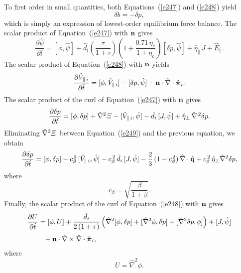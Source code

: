 \documentclass[notitlepage,12pt]{article}
\newcommand{\bpi}{\mbox{\boldmath$\pi$}}
\begin{document}
 To first order in small quantities, both Equations~(\ref{e247}) and (\ref{e248}) yield
 \begin{equation}
 \delta b =- \delta p,
 \end{equation}
 which is simply an expression of lowest-order equilibrium force balance. The scalar product of Equation~(\ref{e247}) with ${\bf n}$ gives
 \begin{equation}\label{e252}
 \frac{\partial\hat{\psi}}{\partial\hat{t}}= [\phi,\hat{\psi}] +\hat{d}_i\!\left(\frac{\tau}{1+\tau}\right)\left(1+\frac{0.71\,\eta_e}{1+\eta_e}\right)
 [\delta p,\hat{\psi}] + \hat{\eta}_\parallel\,J + \hat{E}_\parallel.
 \end{equation}
  The scalar product of Equation~(\ref{e248}) with ${\bf n}$ yields
 \begin{equation}\label{e254}
 \frac{\partial\hat{V}_{\parallel\,i}}{\partial\hat{t}}= [\phi,\hat{V}_{\parallel\,i}]-[\delta p,\hat{\psi}] -{\bf n}\cdot\hat{\nabla}\cdot\hat{\bpi}_i.
 \end{equation}
 The scalar product of the curl of Equation~(\ref{e247}) with ${\bf n}$ gives
 \begin{equation}
 \frac{\partial\delta p}{\partial\hat{t}}= [\phi,\delta p]+\hat{\nabla}^2{\mit\Xi}-[\hat{V}_{\parallel\,i},\hat{\psi}]
 -\hat{d}_i\,[J,\hat{\psi}] +\hat{\eta}_\perp\,\hat{\nabla}^{\,2}\delta p.
 \end{equation}
 Eliminating $\hat{\nabla}^2{\mit\Xi}$ between Equation~(\ref{e249}) and the previous equation, we obtain
 \begin{align}\label{e256}
 \frac{\partial\delta p}{\partial\hat{t}}= [\phi,\delta p]-c_\beta^{\,2}\,[\hat{V}_{\parallel\,i},\hat{\psi}]-c_\beta^{\,2}\,\hat{d}_i\,[J,\hat{\psi}]
 -\frac{2}{3}\,(1-c_\beta^{\,2})\,\hat{\nabla}\cdot\hat{\bf q} +c_\beta^{\,2}\,\hat{\eta}_\perp \hat{\nabla}^2\delta p,
 \end{align}
 where
 \begin{equation}\label{e257}
 c_\beta = \sqrt{\frac{\beta}{1+\beta}}.
 \end{equation}
 Finally, the scalar product of the curl of Equation~(\ref{e248}) with ${\bf n}$ gives 
 \begin{align}\label{e258}
 \frac{\partial U}{\partial\hat{t}}& = [\phi,U] + \frac{\hat{d}_i}{2\,(1+\tau)}\left(
 \hat{\nabla}^2[\phi,\delta p] + [\hat{\nabla}^2\phi,\delta p] + [\hat{\nabla}^2 \delta p,\phi]\right)
 + [J,\hat{\psi}] \nonumber\\[0.5ex]&\phantom{=} + {\bf n}\cdot\hat{\nabla}\times \hat{\nabla}\cdot\hat{\bpi}_i,
 \end{align}
 where 
 \begin{equation}
 U = \hat{\nabla}^{2}\phi.
 \end{equation}
 
\end{document}
